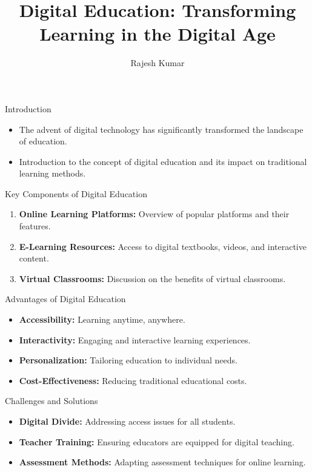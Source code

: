 \documentclass{beamer}
\title{Digital Education: Transforming Learning in the Digital Age}
\author{Rajesh Kumar}
\date{}
\begin{document}
\begin{frame}
  \titlepage
\end{frame}

\begin{frame}{Introduction}
  \begin{itemize}
    \item The advent of digital technology has significantly transformed the landscape of education.
    \item Introduction to the concept of digital education and its impact on traditional learning methods.
  \end{itemize}
\end{frame}

\begin{frame}{Key Components of Digital Education}
  \begin{enumerate}
    \item \textbf{Online Learning Platforms:} Overview of popular platforms and their features.
    \item \textbf{E-Learning Resources:} Access to digital textbooks, videos, and interactive content.
    \item \textbf{Virtual Classrooms:} Discussion on the benefits of virtual classrooms.
  \end{enumerate}
\end{frame}

\begin{frame}{Advantages of Digital Education}
  \begin{itemize}
    \item \textbf{Accessibility:} Learning anytime, anywhere.
    \item \textbf{Interactivity:} Engaging and interactive learning experiences.
    \item \textbf{Personalization:} Tailoring education to individual needs.
    \item \textbf{Cost-Effectiveness:} Reducing traditional educational costs.
  \end{itemize}
\end{frame}

\begin{frame}{Challenges and Solutions}
  \begin{itemize}
    \item \textbf{Digital Divide:} Addressing access issues for all students.
    \item \textbf{Teacher Training:} Ensuring educators are equipped for digital teaching.
    \item \textbf{Assessment Methods:} Adapting assessment techniques for online learning.
  \end{itemize}
\end{frame}
\end{document}
